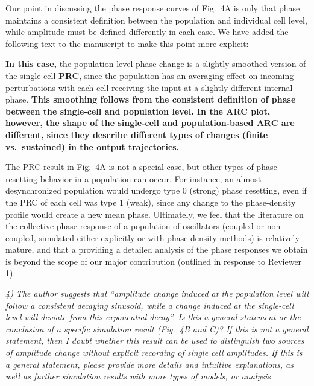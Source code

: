 \documentclass[11pt, letterpaper]{article}
\newenvironment{reviewer}{\itshape\color{gray}}{}
\newenvironment{manuscript}[1]{\begin{center}\begin{tcolorbox}[colback=green!5!white,colframe=green!75!black,width=0.8\textwidth,title={#1},breakable,fonttitle=\bfseries]}{\end{tcolorbox}\end{center}}
\begin{document}
Our point in discussing the phase response curves of Fig.~4A is only that phase maintains a consistent definition between the population and individual cell level, while amplitude must be defined differently in each case.
We have added the following text to the manuscript to make this point more explicit:

\begin{manuscript}{Page 14}
  {\bfseries In this case,} the population-level phase change is a slightly smoothed version of the single-cell {\bfseries PRC}, since the population has an averaging effect on incoming perturbations with each cell receiving the input at a slightly different internal phase.
{\bfseries This smoothing follows from the consistent definition of phase between the single-cell and population level.
In the ARC plot, however, the shape of the single-cell and population-based ARC are different, since they describe different types of changes (finite vs.\ sustained) in the output trajectories.}
\end{manuscript}

The PRC result in Fig.~4A is not a special case, but other types of phase-resetting behavior in a population can occur.
For instance, an almost desynchronized population would undergo type 0 (strong) phase resetting, even if the PRC of each cell was type 1 (weak), since any change to the phase-density profile would create a new mean phase.
Ultimately, we feel that the literature on the collective phase-response of a population of oscillators (coupled or non-coupled, simulated either explicitly or with phase-density methods) is relatively mature, and that a providing a detailed analysis of the phase responses we obtain is beyond the scope of our major contribution (outlined in response to Reviewer 1).
 
\begin{reviewer}
4) The author suggests that ``amplitude change induced at the population level will follow a consistent decaying sinusoid, while a change induced at the single-cell level will deviate from this exponential decay''.
Is this a general statement or the conclusion of a specific simulation result (Fig.~4B and C)? If this is not a general statement, then I doubt whether this result can be used to distinguish two sources of amplitude change without explicit recording of single cell amplitudes.
If this is a general statement, please provide more details and intuitive explanations, as well as further simulation results with more types of models, or analysis.
\end{reviewer}
 
\end{document}
